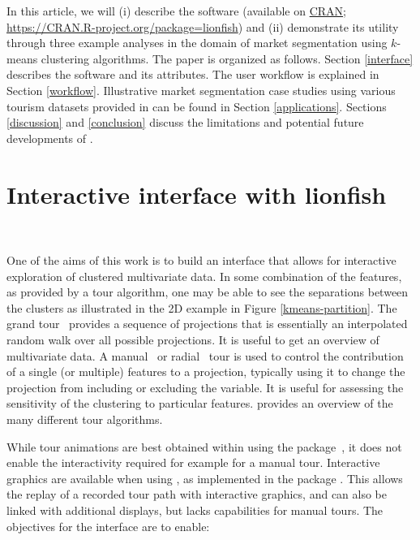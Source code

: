 \documentclass[article]{ajs}
\begin{document}
In this article, we will (i) describe the  software (available on \href{https://CRAN.R-project.org/package=lionfish }{CRAN}; \href{https://CRAN.R-project.org/package=lionfish}{https://CRAN.R-project.org/package=lionfish}) and (ii) demonstrate its utility through three example analyses in the domain of market segmentation using $k$-means clustering algorithms. The paper is organized as follows. Section \ref{interface} describes the software and its attributes. The user workflow is explained in Section \ref{workflow}. Illustrative market segmentation case studies using various tourism datasets provided in \cite{leisch2018market} can be found in Section \ref{applications}. Sections \ref{discussion} and \ref{conclusion} discuss the limitations and potential future developments of .

\section{Interactive interface with lionfish}~\label{interface}

One of the aims of this work is to build an interface that allows for interactive exploration of clustered multivariate data. In some combination of the features, as provided by a tour algorithm, one may be able to see the separations between the clusters as illustrated in the 2D example in Figure \ref{kmeans-partition}. The grand tour~\citep{Asimov1985-xr} provides a sequence of projections that is essentially an interpolated random walk over all possible projections. It is useful to get an overview of multivariate data. A manual~\citep{cook_manual_1997} or radial~\citep{laa2023new} tour is used to control the contribution of a single (or multiple) features to a projection, typically using it to change the projection from including or excluding the variable. It is useful for assessing the sensitivity of the clustering to particular features. \citet{lee2022} provides an overview of the many different tour algorithms.

While tour animations are best obtained within  using the  package~\citep{tourr}, it does not enable the interactivity required for example for a manual tour. Interactive graphics are available when using , as implemented in the  package \citep{RJ-2023-052}. This allows the replay of a recorded tour path with interactive graphics, and can also be linked with additional displays, but lacks capabilities for manual tours. The objectives for the interface are to enable:
\end{document}
